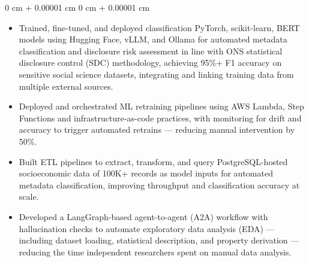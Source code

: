 \documentclass[6pt, letterpaper]{article}
\newenvironment{highlights}{
    \begin{itemize}[
        topsep=0.03 cm,
        parsep=0.03 cm,
        partopsep=0pt,
        itemsep=0pt,
        leftmargin=0 cm + 10pt
    ]
}{
    \end{itemize}
} %
\newenvironment{onecolentry}{
    \begin{adjustwidth}{
        0 cm + 0.00001 cm
    }{
        0 cm + 0.00001 cm
    }
}{
    \end{adjustwidth}
} %
\begin{document}
        \begin{onecolentry}
        \begin{highlights}

            \item Trained, fine-tuned, and deployed classification PyTorch, scikit-learn, BERT models using Hugging Face, vLLM, and Ollama for automated metadata classification and disclosure risk assessment in line with ONS statistical disclosure control (SDC) methodology, achieving 95\%+ F1 accuracy on sensitive social science datasets, integrating and linking training data from multiple external sources.
            \item Deployed and orchestrated ML retraining pipelines using AWS Lambda, Step Functions and infrastructure-as-code practices, with monitoring for drift and accuracy to trigger automated retrains — reducing manual intervention by 50\%.
            \item Built ETL pipelines to extract, transform, and query PostgreSQL-hosted socioeconomic data of 100K+ records as model inputs for automated metadata classification, improving throughput and classification accuracy at scale.
            \item Developed a LangGraph-based agent-to-agent (A2A) workflow with hallucination checks to automate exploratory data analysis (EDA) — including dataset loading, statistical description, and property derivation — reducing the time independent researchers spent on manual data analysis.

\end{highlights}
\end{onecolentry}
\end{document}
